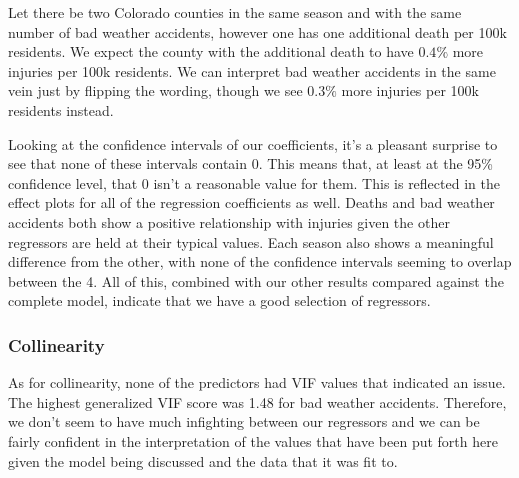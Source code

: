 Let there be two Colorado counties in the same season and with the same number of bad weather accidents, however one has one additional death per 100k residents. We expect the county with the additional death to have $0.4\%$ more injuries per 100k residents. We can interpret bad weather accidents in the same vein just by flipping the wording, though we see $0.3\%$ more injuries per 100k residents instead.

Looking at the confidence intervals of our coefficients, it's a pleasant surprise to see that none of these intervals contain 0. This means that, at least at the 95\% confidence level, that 0 isn't a reasonable value for them. This is reflected in the effect plots for all of the regression coefficients as well. Deaths and bad weather accidents both show a positive relationship with injuries given the other regressors are held at their typical values. Each season also shows a meaningful difference from the other, with none of the confidence intervals seeming to overlap between the 4. All of this, combined with our other results compared against the complete model, indicate that we have a good selection of regressors. 

\subsubsection*{Collinearity}

As for collinearity, none of the predictors had VIF values that indicated an issue. The highest generalized VIF score was 1.48 for bad weather accidents. Therefore, we don't seem to have much infighting between our regressors and we can be fairly confident in the interpretation of the values that have been put forth here given the model being discussed and the data that it was fit to.